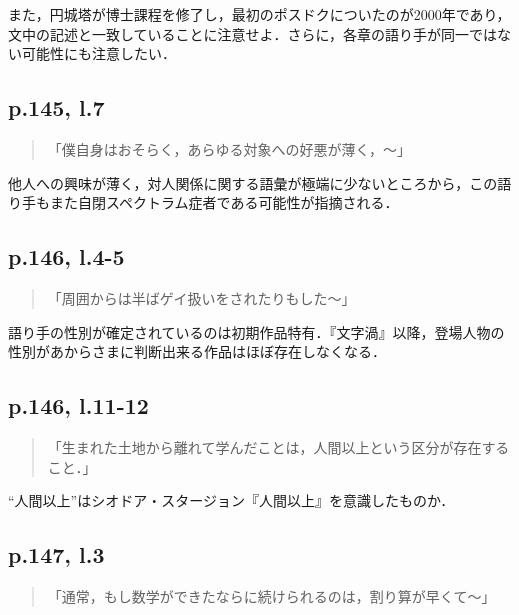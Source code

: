 \documentclass[10pt, a5paper, twoside]{ltjsarticle}
\begin{document}
            また，円城塔が博士課程を修了し，最初のポスドクについたのが2000年であり，文中の記述と一致していることに注意せよ．さらに，各章の語り手が同一ではない可能性にも注意したい．

        \subsection{p.145, l.7}

            \begin{quote}
                「僕自身はおそらく，あらゆる対象への好悪が薄く，〜」
            \end{quote}

            他人への興味が薄く，対人関係に関する語彙が極端に少ないところから，この語り手もまた自閉スペクトラム症者である可能性が指摘される．

        \subsection{p.146, l.4-5}

            \begin{quote}
                「周囲からは半ばゲイ扱いをされたりもした〜」
            \end{quote}

            語り手の性別が確定されているのは初期作品特有．『文字渦』以降，登場人物の性別があからさまに判断出来る作品はほぼ存在しなくなる．

        \subsection{p.146, l.11-12}

            \begin{quote}
                「生まれた土地から離れて学んだことは，人間以上という区分が存在すること．」
            \end{quote}

            “人間以上”はシオドア・スタージョン『人間以上』を意識したものか．

        \subsection{p.147, l.3}

            \begin{quote}
                「通常，もし数学ができたならに続けられるのは，割り算が早くて〜」
            \end{quote}
\end{document}
